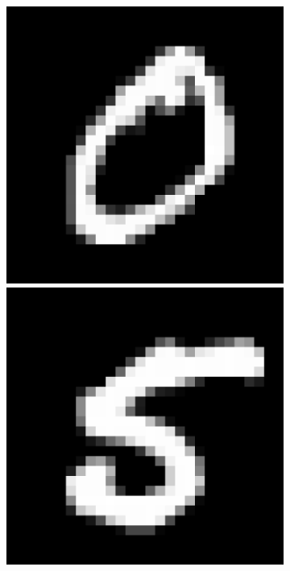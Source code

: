 \begin{figure}[H]
    \centering
    \begin{subfigure}[b]{2cm}
    \includegraphics[width =\textwidth]{figs/MNIST/mnist_0.pdf}
    \vspace{-1.07\baselineskip}\\[1ex]
    \includegraphics[width =\textwidth]{figs/MNIST/mnist_5.pdf}

\end{subfigure}
\end{figure}
